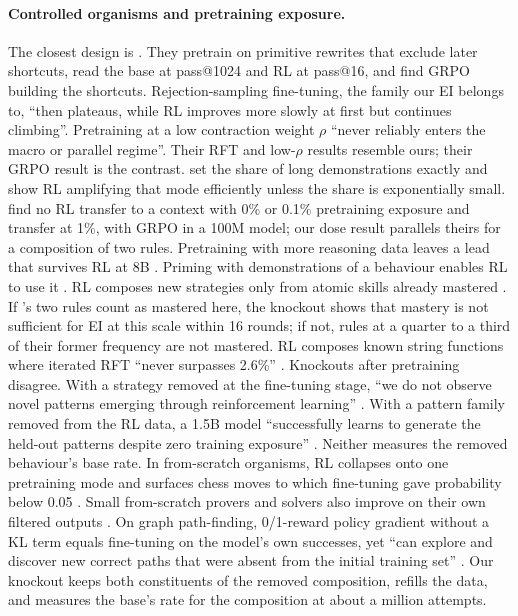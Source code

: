\paragraph{Controlled organisms and pretraining exposure.} The closest design is \citet{abdulsalam2026rewrite}. They
pretrain on primitive rewrites that exclude later shortcuts, read the base at pass@1024 and RL at pass@16, and find GRPO
building the shortcuts. Rejection-sampling fine-tuning, the family our EI belongs to, ``then plateaus, while RL improves
more slowly at first but continues climbing''. Pretraining at a low contraction weight $\rho$ ``never
reliably enters the macro or parallel regime''. Their RFT and low-$\rho$ results resemble ours; their GRPO result is
the contrast. \citet{tsilivis2025rlntp} set the share of long demonstrations exactly and show RL amplifying that mode
efficiently unless the share is exponentially small. \citet{zhang2025interplay} find no RL transfer to a context with
0\% or 0.1\% pretraining exposure and transfer at 1\%, with GRPO in a 100M model; our dose result parallels theirs for
a composition of two rules. Pretraining with more reasoning data leaves a lead that survives RL at 8B \citep{akter2025frontloading}.
Priming with demonstrations of a behaviour enables RL to use it \citep{gandhi2025cognitive}. RL composes new strategies
only from atomic skills already mastered \citep{cheng2025atomicskills}. If \sig{}'s two rules count as mastered here,
the knockout shows that mastery is not sufficient for EI at this scale within 16 rounds; if not, rules at a quarter to a third of their
former frequency are not mastered. RL composes known string functions where iterated RFT ``never surpasses 2.6\%''
\citep{yuan2025fgx}. Knockouts after pretraining disagree. With a strategy removed at the fine-tuning stage, ``we do not
observe novel patterns emerging through reinforcement learning'' \citep{krishnamurthy2026select}. With a pattern family
removed from the RL data, a 1.5B model ``successfully learns to generate the held-out patterns despite zero training
exposure'' \citep{park2025countdown}. Neither measures the removed behaviour's base rate. In from-scratch organisms, RL collapses onto one pretraining
mode \citep{zhao2025echochamber} and surfaces chess moves to which fine-tuning gave probability below 0.05
\citep{shen2026chess}. Small from-scratch provers and solvers also improve on their own filtered outputs
\citep{poesia2024minimo,lee2025selfimproving}. On graph path-finding, 0/1-reward policy gradient without a KL term
equals fine-tuning on the model's own successes, yet ``can explore and discover new correct paths that were absent from
the initial training set'' \citep{wang2025rlplanning}. Our knockout keeps both constituents of the removed composition, refills
the data, and measures the base's rate for the composition at about a million attempts.

